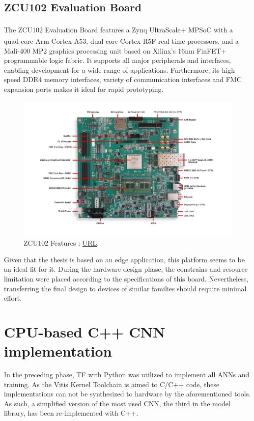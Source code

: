 \subsection{ZCU102 Evaluation Board}
The ZCU102 Evaluation Board features a Zynq\textsuperscript{\textregistered} UltraScale+\texttrademark{} MPSoC with a quad-core Arm\textsuperscript{\textregistered} Cortex\textsuperscript{\textregistered}-A53, dual-core Cortex-R5F real-time processors, and a Mali\texttrademark{}-400 MP2 graphics processing unit based on Xilinx's 16nm FinFET+ programmable logic fabric. It supports all major peripherals and interfaces, enabling development for a wide range of applications. Furthermore, its high speed DDR4 memory interfaces, variety of communication interfaces and FMC expansion ports makes it ideal for rapid prototyping. 

\begin{figure}[H]
    \centering
        \includegraphics[width=1\textwidth]{Images/Hardware/zcu102.jpg}
        \decoRule
        \caption[ZCU102]{ZCU102 Features \cite{ZCU_102}: \href{https://www.xilinx.com/products/boards-and-kits/ek-u1-zcu102-g.html\#information}{URL}.}
        \label{fig:ZCU102}
\end{figure}

Given that the thesis is based on an edge application, this platform seems to be an ideal fit for it. During the hardware design phase, the constrains and resource limitation were placed according to the specifications of this board. Nevertheless, transferring the final design to devices of similar families should require minimal effort.

\section{CPU-based C++ CNN implementation}
\label{sec:C++_CNN_implementation}
In the preceding phase, TF with Python was utilized to implement all ANNs and training. As the Vitis Kernel Toolchain is aimed to C/C++ code, these implementations can not be synthesized to hardware by the aforementioned tools. As such, a simplified version of the most used CNN, the third in the model library, has been re-implemented with C++.

